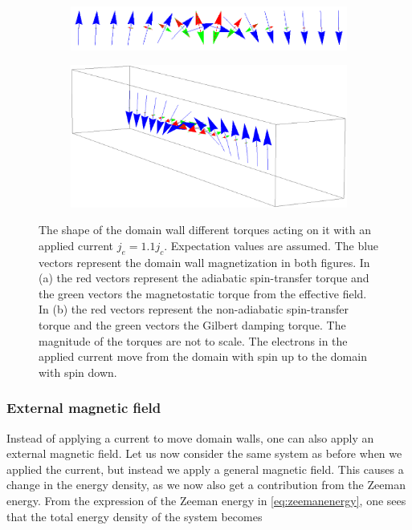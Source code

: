 \documentclass[1p]{elsarticle}		%
\numberwithin{equation}{section}
\begin{document}
\begin{figure}[h!]
\centering
\begin{subfigure}{\textwidth}
  \centering
  \includegraphics[width=1.0\linewidth]{Figures/NeelJeGTJcAdSTTMS.png}
  \caption{}
  \label{fig:Neel_AdSTT_Heff_JeGTJc}
\end{subfigure}
\begin{subfigure}{\textwidth}
  \centering
  \includegraphics[width=1.0\linewidth]{Figures/NeelJeGTJcNonAdSTTGD.png}
  \caption{}
  \label{fig:Neel_NonAdSTT_GD_JeGTJc}
\end{subfigure}
\caption{The shape of the domain wall different torques acting on it with an applied current $j_e=1.1j_c$. Expectation values are assumed. The blue vectors represent the domain wall magnetization in both figures. In (a) the red vectors represent the adiabatic spin-transfer torque and the green vectors the magnetostatic torque from the effective field. In (b) the red vectors represent the non-adiabatic spin-transfer torque and the green vectors the Gilbert damping torque. The magnitude of the torques are not to scale. The electrons in the applied current move from the domain with spin up to the domain with spin down.}
\label{fig:DW_JeGTJc}
\end{figure}

\subsubsection{External magnetic field}
Instead of applying a current to move domain walls, one can also apply an external magnetic field. Let us now consider the same system as before when we applied the current, but instead we apply a general magnetic field. This causes a change in the energy density, as we now also get a contribution from the Zeeman energy. From the expression of the Zeeman energy in \eqref{eq:zeemanenergy}, one sees that the total energy density of the system becomes
\end{document}
